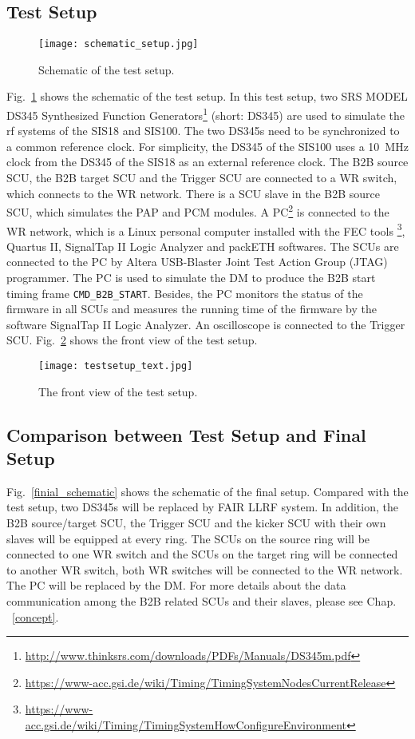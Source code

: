 \subsection{Test Setup}
\label{sec:test_timing}
\begin{figure}[H]
   \centering   
   \texttt{[image: schematic\_setup.jpg]}
   \caption{Schematic of the test setup.}
   \label{setup}
\end{figure}
Fig.~\ref{setup} shows the schematic of the test setup. In this test setup, two SRS MODEL DS345 Synthesized Function Generators\footnote{\url{http://www.thinksrs.com/downloads/PDFs/Manuals/DS345m.pdf}} (short: DS345) are used to simulate the rf systems of the SIS18 and SIS100. The two DS345s need to be synchronized to a common reference clock. For simplicity, the DS345 of the SIS100 uses a \SI{10}{\MHz} clock from the DS345 of the SIS18 as an external reference clock. The B2B source SCU, the B2B target SCU and the Trigger SCU are connected to a WR switch, which connects to the WR network. There is a SCU slave in the B2B source SCU, which simulates the PAP and PCM modules. A \gls{PC}\footnote{\url{https://www-acc.gsi.de/wiki/Timing/TimingSystemNodesCurrentRelease}} is connected to the WR network, which is a Linux personal computer installed with the FEC tools \footnote{\url{https://www-acc.gsi.de/wiki/Timing/TimingSystemHowConfigureEnvironment}}, Quartus II, SignalTap II Logic Analyzer and packETH softwares. The SCUs are connected to the PC by Altera USB-Blaster Joint Test Action Group (JTAG) programmer. The PC is used to simulate the DM to produce the B2B start timing frame \verb|CMD_B2B_START|. Besides, the PC monitors the status of the firmware in all SCUs and measures the running time of the firmware by the software SignalTap II Logic Analyzer. An oscilloscope is connected to the Trigger SCU. Fig.~\ref{testsetup_text} shows the front view of the test setup. 
\begin{figure}[!htb]
   \centering   
   \texttt{[image: testsetup\_text.jpg]}
   \caption{The front view of the test setup.}
   \label{testsetup_text}
\end{figure}

\subsection{Comparison between Test Setup and Final Setup}
Fig.~\ref{finial_schematic} shows the schematic of the final setup. Compared with the test setup, two DS345s will be replaced by FAIR LLRF system. In addition, the B2B source/target SCU, the Trigger SCU and the kicker SCU with their own slaves will be equipped at every ring. The SCUs on the source ring will be connected to one WR switch and the SCUs on the target ring will be connected to another WR switch, both WR switches will be connected to the WR network. The PC will be replaced by the DM. For more details about the data communication among the B2B related SCUs and their slaves, please see Chap. ~\ref{concept}.   

